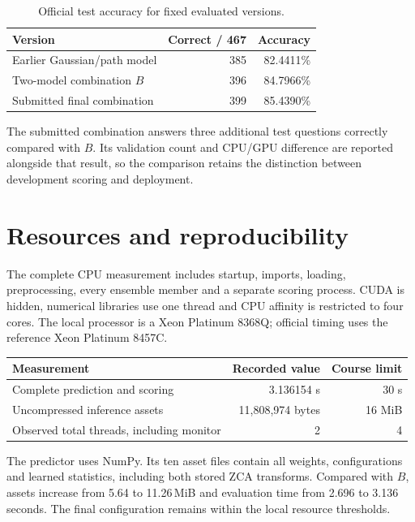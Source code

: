 \documentclass[11pt,a4paper]{article}
\begin{document}
\begin{table}[htbp]
\centering\small
\begin{tabularx}{\linewidth}{Yrr}
\toprule
Version & Correct / 467 & Accuracy \\
\midrule
Earlier Gaussian/path model & 385 & 82.4411\% \\
Two-model combination $B$ & 396 & 84.7966\% \\
Submitted final combination & 399 & 85.4390\% \\
\bottomrule
\end{tabularx}
\caption{Official test accuracy for fixed evaluated versions.}
\label{tab:test}
\end{table}

The submitted combination answers three additional test questions correctly compared with $B$. Its validation count and CPU/GPU difference are reported alongside that result, so the comparison retains the distinction between development scoring and deployment.

\section{Resources and reproducibility}

The complete CPU measurement includes startup, imports, loading, preprocessing, every ensemble member and a separate scoring process. CUDA is hidden, numerical libraries use one thread and CPU affinity is restricted to four cores. The local processor is a Xeon Platinum 8368Q; official timing uses the reference Xeon Platinum 8457C.

\begin{center}
\small
\begin{tabularx}{\linewidth}{Yrr}
\toprule
Measurement & Recorded value & Course limit \\
\midrule
Complete prediction and scoring & 3.136154 s & 30 s \\
Uncompressed inference assets & 11,808,974 bytes & 16 MiB \\
Observed total threads, including monitor & 2 & 4 \\
\bottomrule
\end{tabularx}
\end{center}

The predictor uses NumPy. Its ten asset files contain all weights, configurations and learned statistics, including both stored ZCA transforms. Compared with $B$, assets increase from 5.64 to 11.26\,MiB and evaluation time from 2.696 to 3.136 seconds. The final configuration remains within the local resource thresholds.
\end{document}
